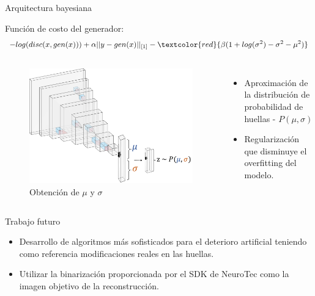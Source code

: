 \documentclass[12pt,aspectratio=169]{beamer}
\begin{document}
\begin{frame}{Arquitectura bayesiana}

    Función de costo del generador:
    \begin{equation}
        - log(disc(x,gen(x)))+\alpha||y-gen(x)||_{[1]}-\textcolor{red}{\beta(1+log(\sigma^{2})-\sigma^{2}-\mu^{2})}
    \end{equation}
    
    \begin{columns}[c] 
            \begin{figure}
                \includegraphics[scale=0.26]{figs/latent_vector.png}
                \caption{Obtención de $\mu$ y $\sigma$}
            \end{figure}
            \begin{itemize}
                \item Aproximación de la distribución de probabilidad de huellas - $P(\mu,\sigma)$
                \vspace{10mm}
                \item Regularización que disminuye el overfitting del modelo.
            \end{itemize}
    \end{columns}
    
\end{frame}

\begin{frame}{Trabajo futuro}

    \begin{itemize}
        \setlength\itemsep{5mm}
        \item Desarrollo de algoritmos más sofisticados para el deterioro artificial teniendo como referencia modificaciones reales en las huellas.
        \item Utilizar la binarización proporcionada por el SDK de NeuroTec como la imagen objetivo de la reconstrucción.
    \end{itemize}

\end{frame}
\end{document}

